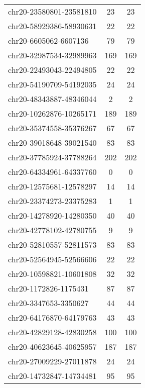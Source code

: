 \documentclass[10pt,letterpaper]{article}
\begin{document}
{\begin{longtable}{lSS}
	chr20-23580801-23581810 & 23     & 23                    \\
	chr20-58929386-58930631 & 22     & 22                    \\
	chr20-6605062-6607136   & 79     & 79                    \\
	chr20-32987534-32989963 & 169    & 169                   \\
	chr20-22493043-22494805 & 22     & 22                    \\
	chr20-54190709-54192035 & 24     & 24                    \\
	chr20-48343887-48346044 & 2      & 2                     \\
	chr20-10262876-10265171 & 189    & 189                   \\
	chr20-35374558-35376267 & 67     & 67                    \\
	chr20-39018648-39021540 & 83     & 83                    \\
	chr20-37785924-37788264 & 202    & 202                   \\
	chr20-64334961-64337760 & 0      & 0                     \\
	chr20-12575681-12578297 & 14     & 14                    \\
	chr20-23374273-23375283 & 1      & 1                     \\
	chr20-14278920-14280350 & 40     & 40                    \\
	chr20-42778102-42780755 & 9      & 9                     \\
	chr20-52810557-52811573 & 83     & 83                    \\
	chr20-52564945-52566606 & 22     & 22                    \\
	chr20-10598821-10601808 & 32     & 32                    \\
	chr20-1172826-1175431   & 87     & 87                    \\
	chr20-3347653-3350627   & 44     & 44                    \\
	chr20-64176870-64179763 & 43     & 43                    \\
	chr20-42829128-42830258 & 100    & 100                   \\
	chr20-40623645-40625957 & 187    & 187                   \\
	chr20-27009229-27011878 & 24     & 24                    \\
	chr20-14732847-14734481 & 95     & 95                    \\

\end{longtable}}
\end{document}
